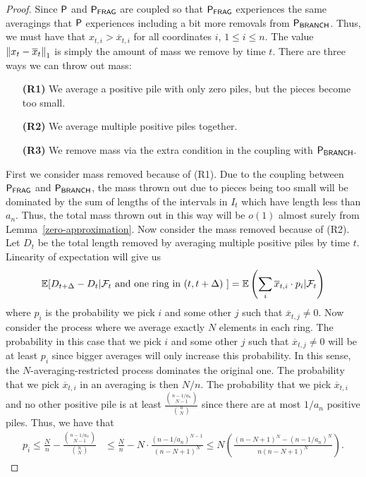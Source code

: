 \documentclass[12pt]{article}
\begin{document}
\begin{proof}
	Since $\mathsf{P}$ and $\mathsf{P}_{\mathsf{FRAG}}$ are coupled so that $\mathsf{P}_{\mathsf{FRAG}}$ experiences the same averagings that $\mathsf{P}$ experiences including a bit more removals from $\mathsf{P}_{\mathsf{BRANCH}}$. Thus, we must have that $x_{t, i} > \overline{x}_{t, i}$ for all coordinates $i$, $1 \leq i \leq n$. The value $\left\lVert x_t - \overline{x}_t \right\rVert_1$ is simply the amount of mass we remove by time $t$. There are three ways we can throw out mass:
	\begin{enumerate}
		\item[\textbf{(R1)}] We average a positive pile with only zero piles, but the pieces become too small. 

		\item[\textbf{(R2)}] We average multiple positive piles together. 

		\item[\textbf{(R3)}] We remove mass via the extra condition in the coupling with $\mathsf{P}_{\mathsf{BRANCH}}$. 
	\end{enumerate} 
	First we consider mass removed because of (R1). Due to the coupling between $\mathsf{P}_{\mathsf{FRAG}}$ and $\mathsf{P}_{\mathsf{BRANCH}}$, the mass thrown out due to pieces being too small will be dominated by the sum of lengths of the intervals in $I_t$ which have length less than $a_n$. Thus, the total mass thrown out in this way will be $o(1)$ almost surely from Lemma~\ref{zero-approximation}. Now consider the mass removed because of (R2). Let $D_t$ be the total length removed by averaging multiple positive piles by time $t$. Linearity of expectation will give us
	\[
		\mathbb{E} [ D_{t + \Delta} - D_t | \mathcal{F}_t \text{ and one ring in $(t, t + \Delta)$ } ] = \mathbb{E} \left ( \sum_i \overline{x}_{t, i} \cdot p_{i} | \mathcal{F}_t \right )
	\]
	where $p_i$ is the probability we pick $i$ and some other $j$ such that $\overline{x}_{t, j} \neq 0$. Now consider the process where we average exactly $N$ elements in each ring. The probability in this case that we pick $i$ and some other $j$ such that $\overline{x}_{t, j} \neq 0$ will be at least $p_i$ since bigger averages will only increase this probability. In this sense, the $N$-averaging-restricted process dominates the original one. The probability that we pick $\overline{x}_{t, i}$ in an averaging is then $N / n$. The probability that we pick $\overline{x}_{t, i}$ and no other positive pile is at least $\frac{\binom{n - 1/a_n}{N-1}}{\binom{n}{N}}$ since there are at most $1/a_n$ positive piles. Thus, we have that
	\begin{align*}
		p_i \leq \frac{N}{n} - \frac{\binom{n-1/a_n}{N-1}}{\binom{n}{N}} & \leq \frac{N}{n} - N \cdot \frac{(n-1/a_n)^{N-1}}{(n-N+1)^N} \leq N \left ( \frac{(n-N+1)^N - (n-1/a_n)^N}{n(n-N+1)^N} \right ). 

\end{align*}
\end{proof}
\end{document}
